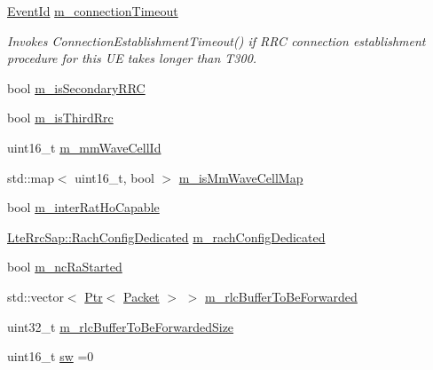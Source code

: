 \begin{DoxyCompactItemize}
\item 
\hyperlink{classns3_1_1EventId}{Event\+Id} \hyperlink{classns3_1_1LteUeRrc_ab8f41a26e439cf7619c04ef4950d5f9f}{m\+\_\+connection\+Timeout}
\begin{DoxyCompactList}\small\item\em Invokes Connection\+Establishment\+Timeout() if R\+RC connection establishment procedure for this UE takes longer than T300. \end{DoxyCompactList}\item 
bool \hyperlink{classns3_1_1LteUeRrc_a00a3ffa4dd31c1ab66921a9a019f5586}{m\+\_\+is\+Secondary\+R\+RC}
\item 
bool \hyperlink{classns3_1_1LteUeRrc_a5412b24e867c43a3ca7ed055e1b20c09}{m\+\_\+is\+Third\+Rrc}
\item 
uint16\+\_\+t \hyperlink{classns3_1_1LteUeRrc_a28b83564a465159f0cf6d75d4b48d7eb}{m\+\_\+mm\+Wave\+Cell\+Id}
\item 
std\+::map$<$ uint16\+\_\+t, bool $>$ \hyperlink{classns3_1_1LteUeRrc_aeeda32d2655317078eb67377e81aea02}{m\+\_\+is\+Mm\+Wave\+Cell\+Map}
\item 
bool \hyperlink{classns3_1_1LteUeRrc_a0702e1a453de2d8f1c454fea344ef4f0}{m\+\_\+inter\+Rat\+Ho\+Capable}
\item 
\hyperlink{structns3_1_1LteRrcSap_1_1RachConfigDedicated}{Lte\+Rrc\+Sap\+::\+Rach\+Config\+Dedicated} \hyperlink{classns3_1_1LteUeRrc_a926593f8b804731968b52072ba31bfa8}{m\+\_\+rach\+Config\+Dedicated}
\item 
bool \hyperlink{classns3_1_1LteUeRrc_a15d55f6ff2b347d2ea0610b66513fbdb}{m\+\_\+nc\+Ra\+Started}
\item 
std\+::vector$<$ \hyperlink{classns3_1_1Ptr}{Ptr}$<$ \hyperlink{classns3_1_1Packet}{Packet} $>$ $>$ \hyperlink{classns3_1_1LteUeRrc_acf565bc650023495082a94923956fb1a}{m\+\_\+rlc\+Buffer\+To\+Be\+Forwarded}
\item 
uint32\+\_\+t \hyperlink{classns3_1_1LteUeRrc_afb37a53dac05a0ae624acab488e33d6f}{m\+\_\+rlc\+Buffer\+To\+Be\+Forwarded\+Size}
\item 
uint16\+\_\+t \hyperlink{classns3_1_1LteUeRrc_a05eb539b50fe4f3240e6e79dcd1df886}{sw} =0
\end{DoxyCompactItemize}
